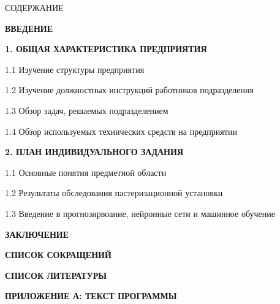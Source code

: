 {\gostTitleFont
    \redline
    СОДЕРЖАНИЕ
} 

\titlespace

{\gostFont
    \par
    \par {\bfseries ВВЕДЕНИЕ }
    \par {\bfseries 1. ОБЩАЯ ХАРАКТЕРИСТИКА ПРЕДПРИЯТИЯ }
    \par 1.1 Изучение структуры предприятия 
    \par 1.2 Изучение должностных инструкций работников подразделения 
    \par 1.3 Обзор задач, решаемых подразделением 
    \par 1.4 Обзор используемых технических средств на предприятии 
    \par {\bfseries 2. ПЛАН ИНДИВИДУАЛЬНОГО ЗАДАНИЯ }
    \par 1.1 Основные понятия предметной области 
    \par 1.2 Результаты обследования пастеризационной установки  
    \par 1.3 Введение в прогнозирвоание, нейронные сети и машинное обучение  
    \par {\bfseries ЗАКЛЮЧЕНИЕ } 
    \par {\bfseries СПИСОК СОКРАЩЕНИЙ } 
    \par {\bfseries СПИСОК ЛИТЕРАТУРЫ } 
    \par {\bfseries ПРИЛОЖЕНИЕ А: ТЕКСТ ПРОГРАММЫ} 
    \par 
}